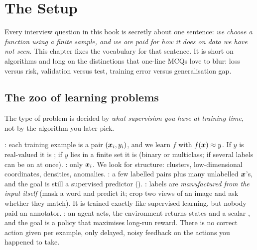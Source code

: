 \chapter{The Setup}
\label{ch:setup}
Every interview question in this book is secretly about one sentence:
\emph{we choose a function using a finite sample, and we are paid for how it does on data we have
not seen}. This chapter fixes the vocabulary for that sentence. It is short on algorithms and long on
the distinctions that one-line MCQs love to blur: loss versus risk, validation versus test, training
error versus generalisation gap.

\section{The zoo of learning problems}

The type of problem is decided by \emph{what supervision you have at training time}, not by the
algorithm you later pick.

\begin{definition}
	\begin{itemize}
		\ii {}: each training example is a pair $({\bm{x}}_i, y_i)$, and we learn $f$ with
		$f({\bm{x}})\approx y$. If $y$ is real-valued it is ; if $y$ lies in a finite set
		it is  (binary or multiclass;  if several labels can
		be on at once).
		\ii {}: only ${\bm{x}}_i$. We look for structure: clusters,
		low-dimensional coordinates, densities, anomalies.
		\ii {}: a few labelled pairs plus many unlabelled ${\bm{x}}$'s, and the
		goal is still a supervised predictor ().
		\ii {}: labels are \emph{manufactured from the input itself}
		(mask a word and predict it; crop two views of an image and ask whether they match). It is
		trained exactly like supervised learning, but nobody paid an annotator.
		\ii {}: an agent acts, the environment returns states and a
		scalar , and the goal is a policy that maximises long-run reward. There is no
		correct action given per example, only delayed, noisy feedback on the actions you happened
		to take.
	\end{itemize}
\end{definition}

